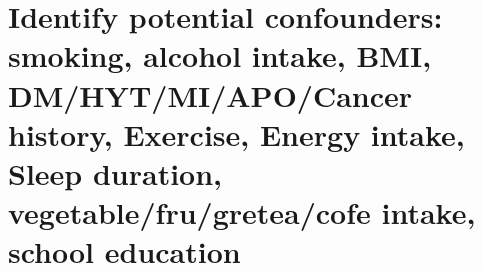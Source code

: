\documentclass[]{article}
\newenvironment{Shaded}{\begin{snugshade}}{\end{snugshade}}
\newcommand{\DataTypeTok}[1]{\textcolor[rgb]{0.13,0.29,0.53}{#1}}
\newcommand{\DecValTok}[1]{\textcolor[rgb]{0.00,0.00,0.81}{#1}}
\newcommand{\FloatTok}[1]{\textcolor[rgb]{0.00,0.00,0.81}{#1}}
\newcommand{\KeywordTok}[1]{\textcolor[rgb]{0.13,0.29,0.53}{\textbf{#1}}}
\newcommand{\NormalTok}[1]{#1}
\newcommand{\OperatorTok}[1]{\textcolor[rgb]{0.81,0.36,0.00}{\textbf{#1}}}
\newcommand{\StringTok}[1]{\textcolor[rgb]{0.31,0.60,0.02}{#1}}
\begin{document}
\begin{Shaded}
\end{Shaded}

\hypertarget{identify-potential-confounders-smoking-alcohol-intake-bmi-dmhytmiapocancer-history-exercise-energy-intake-sleep-duration-vegetablefrugreteacofe-intake-school-education}{%
\section{Identify potential confounders: smoking, alcohol intake, BMI,
DM/HYT/MI/APO/Cancer history, Exercise, Energy intake, Sleep duration,
vegetable/fru/gretea/cofe intake, school
education}\label{identify-potential-confounders-smoking-alcohol-intake-bmi-dmhytmiapocancer-history-exercise-energy-intake-sleep-duration-vegetablefrugreteacofe-intake-school-education}}
\end{document}

